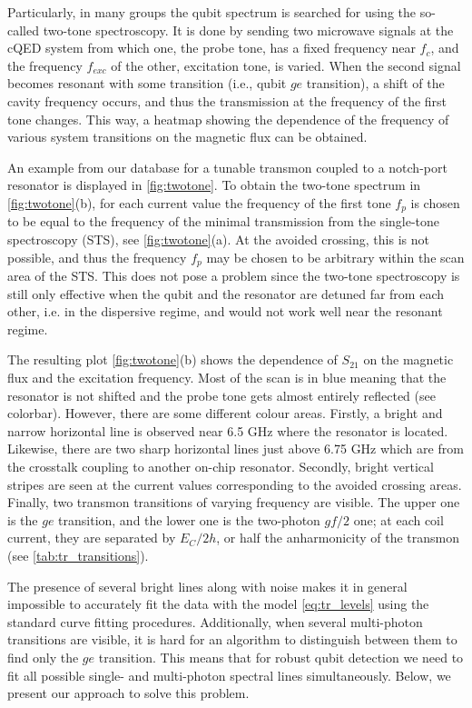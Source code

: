 \documentclass[%
 aip,
 amsmath,amssymb,
 reprint,%
]{revtex4-1}
\begin{document}
Particularly, in many groups the qubit spectrum is searched for using the so-called two-tone spectroscopy\cite{wallraff2007}. It is done by sending two microwave signals at the cQED system from which one, the probe tone, has a fixed frequency near $f_c$, and the frequency $f_{exc}$ of the other, excitation tone,  is varied. When the second signal becomes resonant with some transition (i.e., qubit $ge$ transition), a shift of the cavity frequency occurs, and thus the transmission at the frequency of the first tone changes. This way, a heatmap showing the dependence of the frequency of various system transitions on the magnetic flux can be obtained. 

An example from our database for a tunable transmon coupled to a notch-port resonator is displayed in \autoref{fig:twotone}. To obtain the two-tone spectrum in \autoref{fig:twotone}(b), for each current value the frequency of the first tone $f_p$ is chosen to be equal to the frequency of the minimal transmission from the single-tone spectroscopy (STS), see \autoref{fig:twotone}(a). At the avoided crossing, this is not possible, and thus the frequency $f_p$ may be chosen to be arbitrary within the scan area of the STS. This does not pose a problem since the two-tone spectroscopy is still only effective when the qubit and the resonator are detuned far from each other, i.e. in the dispersive regime\cite{blais2004}, and would not work well near the resonant regime.

The resulting plot \autoref{fig:twotone}(b) shows the dependence of $S_{21}$ on the magnetic flux and the excitation frequency. Most of the scan is in blue meaning that the resonator is not shifted and the probe tone gets almost entirely reflected (see colorbar). However, there are some different colour areas. Firstly, a bright and narrow horizontal line is observed near 6.5 GHz where the resonator is located. Likewise, there are two sharp horizontal lines just above 6.75 GHz which are from the crosstalk coupling to another on-chip resonator. Secondly, bright vertical stripes are seen at the current values corresponding to the avoided crossing areas. Finally, two transmon transitions of varying frequency are visible. The upper one is the $ge$ transition, and the lower one is the two-photon $gf/2$ one; at each coil current, they are separated by $E_C/2h$, or half the anharmonicity of the transmon (see \autoref{tab:tr_transitions}).

The presence of several bright lines along with noise makes it in general impossible to accurately fit the data with the model \eqref{eq:tr_levels} using the standard curve fitting procedures. Additionally, when several multi-photon transitions are visible, it is hard for an algorithm to distinguish between them to find only the $ge$ transition. This means that for robust qubit detection we need to fit all possible single- and multi-photon spectral lines simultaneously. Below, we present our approach to solve this problem.
\end{document}
